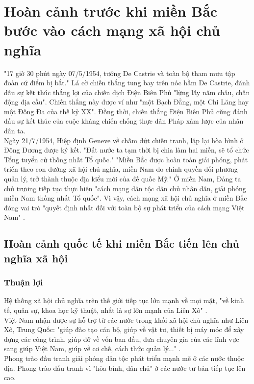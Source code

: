 \section{Hoàn cảnh trước khi miền Bắc bước vào cách mạng xã hội chủ nghĩa}
"17 giờ 30 phút ngày 07/5/1954, tướng De Castrie và toàn bộ tham mưu tập đoàn cứ điểm bị bắt." \supercite{lsvnt4} Lá cờ chiến thắng tung bay trên nóc hầm De Castrie, đánh dấu sự kết thúc thắng lợi của chiến dịch Điện Biên Phủ "lừng lẫy năm châu, chấn động địa cầu". Chiến thắng này được ví như "một Bạch Đằng, một Chi Lăng hay một Đống Đa của thế kỷ XX". \supercite{danvan} Đồng thời, chiến thắng Điện Biên Phủ cũng đánh dấu sự kết thúc của cuộc kháng chiến chống thực dân Pháp xâm lược của nhân dân ta.\\
Ngày 21/7/1954, Hiệp định Geneve về chấm dứt chiến tranh, lập lại hòa bình ở Đông Dương được ký kết. "Đất nước ta tạm thời bị chia làm hai miền, sẽ tổ chức Tổng tuyển cử thống nhất Tổ quốc." \supercite{lsvnt4} "Miền Bắc được hoàn toàn giải phóng, phát triển theo con đường xã hội chủ nghĩa, miền Nam do chính quyền đối phương quản lý, trở thành thuộc địa kiểu mới của đế quốc Mỹ." \supercite{giaotrinh} Ở miền Nam, Đảng ta chủ trương tiếp tục thực hiện "cách mạng dân tộc dân chủ nhân dân, giải phóng miền Nam thống nhất Tổ quốc". \supercite{hvct} Vì vậy, cách mạng xã hội chủ nghĩa ở miền Bắc đóng vai trò "quyết định nhất đối với toàn bộ sự phát triển của cách mạng Việt Nam" \supercite{hvct}.

\subsection{Hoàn cảnh quốc tế khi miền Bắc tiến lên chủ nghĩa xã hội}
\subsubsection{Thuận lợi}
Hệ thống xã hội chủ nghĩa trên thế giới tiếp tục lớn mạnh về mọi mặt, "về kinh tế, quân sự, khoa học kỹ thuật, nhất là sự lớn mạnh của Liên Xô" \supercite{giaotrinh}.\\
Việt Nam nhận được sự hỗ trợ từ các nước trong khối xã hội chủ nghĩa như Liên Xô, Trung Quốc: "giúp đào tạo cán bộ, giúp về vật tư, thiết bị máy móc để xây dựng các công trình, giúp đỡ về vốn ban đầu, đưa chuyên gia của các lĩnh vực sang giúp Việt Nam, giúp về cơ chế, cách thức quản lý..." \supercite{hvct}.\\
Phong trào đấu tranh giải phóng dân tộc phát triển mạnh mẽ ở các nước thuộc địa. Phong trào đấu tranh vì "hòa bình, dân chủ" \supercite{giaotrinh} ở các nước tư bản tiếp tục lên cao.
